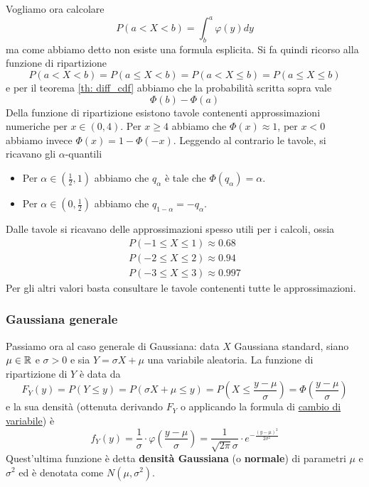 Vogliamo ora calcolare
\[ P(a < X < b) = \int_b^a \varphi (y) dy \]
ma come abbiamo detto non esiste una formula esplicita. Si fa quindi ricorso alla funzione di
ripartizione
\[ P(a < X < b) = P(a \leq X < b) = P(a < X \leq b) = P(a \leq X \leq b) \]
e per il teorema \ref{th: diff_cdf} abbiamo che la probabilità scritta sopra vale
\[ \Phi(b) - \Phi(a) \]
Della funzione di ripartizione esistono tavole contenenti approssimazioni numeriche per
$x \in (0,4)$. Per $x \geq 4$ abbiamo che $\Phi(x) \approx 1$, per $x < 0$ abbiamo invece
$\Phi(x) = 1 - \Phi(-x)$. Leggendo al contrario le tavole, si ricavano gli $\alpha$-quantili
\begin{itemize}
	\item Per $\alpha \in \left(\frac{1}{2}, 1 \right)$ abbiamo che $q_\alpha$ è tale che
	      $\Phi(q_\alpha) = \alpha$.
	\item Per $\alpha \in \left(0, \frac{1}{2} \right)$ abbiamo che $q_{1-\alpha} = -q_\alpha$.
\end{itemize}
Dalle tavole si ricavano delle approssimazioni spesso utili per i calcoli, ossia
\begin{gather*}
	P(-1 \leq X \leq 1) \approx 0.68 \\
	P(-2 \leq X \leq 2) \approx 0.94 \\
	P(-3 \leq X \leq 3) \approx 0.997
\end{gather*}
Per gli altri valori basta consultare le tavole contenenti tutte le approssimazioni.

\subsubsection{Gaussiana generale}
Passiamo ora al caso generale di Gaussiana: data $X$ Gaussiana standard, siano $\mu \in \mathbb{R}$ e
$\sigma > 0$ e sia $Y = \sigma X + \mu$ una variabile aleatoria. La funzione di ripartizione di
$Y$ è data da
\[
	F_Y(y) = P(Y \leq y) = P(\sigma X + \mu \leq y)
	= P\left(X \leq \frac{y - \mu}{\sigma}\right)
	= \Phi \left(\frac{y - \mu}{\sigma}\right)
\]
e la sua densità (ottenuta derivando $F_Y$ o applicando la formula di
\hyperref[prop: cambio_var]{cambio di variabile}) è
\[
	f_Y(y) = \frac{1}{\sigma} \cdot \varphi \left(\frac{y - \mu}{\sigma}\right) =
	\frac{1}{\sqrt{2 \pi} \sigma} \cdot e^{-\frac{(y - \mu)^2}{2 \sigma^2}}
\]
Quest'ultima funzione è detta \textbf{densità Gaussiana} (o \textbf{normale}) di parametri $\mu$ e
$\sigma^2$ ed è denotata come $N(\mu, \sigma^2)$.

